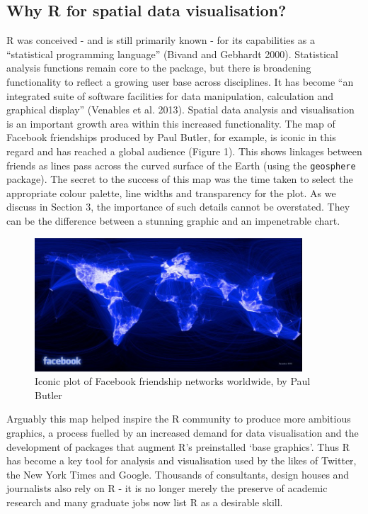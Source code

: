 \documentclass[]{article}
\let\Oldincludegraphics\includegraphics
\renewcommand{\includegraphics}[1]{\Oldincludegraphics[width=10cm]{#1}}
\begin{document}
\subsection{Why R for spatial data visualisation?}

R was conceived - and is still primarily known - for its capabilities as
a ``statistical programming language'' (Bivand and Gebhardt 2000).
Statistical analysis functions remain core to the package, but there is
broadening functionality to reflect a growing user base across
disciplines. It has become ``an integrated suite of software facilities
for data manipulation, calculation and graphical display'' (Venables et
al. 2013). Spatial data analysis and visualisation is an important
growth area within this increased functionality. The map of Facebook
friendships produced by Paul Butler, for example, is iconic in this
regard and has reached a global audience (Figure 1). This shows linkages
between friends as lines pass across the curved surface of the Earth (using
the \texttt{geosphere} package). The secret to the success of this map
was the time taken to select the appropriate colour palette, line widths
and transparency for the plot. As we discuss in Section 3, the importance
of such details cannot be overstated. They can be the difference between
a stunning graphic and an impenetrable chart.

\begin{figure}[htbp]
\centering
\includegraphics{figure/butler_facebook_2.jpg}
\caption{Iconic plot of Facebook friendship networks worldwide, by Paul
Butler}
\end{figure}

Arguably this map helped inspire the R community to produce more ambitious
graphics, a process fuelled by an increased demand for data visualisation
and the development of packages that augment R's preinstalled `base
graphics'. Thus R has become a key tool for analysis and visualisation
used by the likes of Twitter, the New York Times and Google. Thousands
of consultants, design houses and journalists also rely on R - it is no
longer merely the preserve of academic research and many graduate jobs
now list R as a desirable skill.
\end{document}
